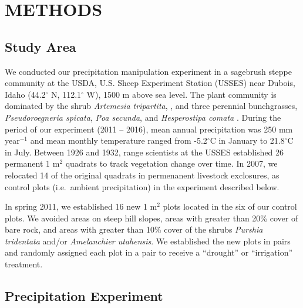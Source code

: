 \documentclass[fleqn,10pt,lineno]{wlpeerj} %
\begin{document}
\hypertarget{methods}{%
\section{METHODS}\label{methods}}

\hypertarget{study-area}{%
\subsection{Study Area}\label{study-area}}

We conducted our precipitation manipulation experiment in a sagebrush
steppe community at the USDA, U.S. Sheep Experiment Station (USSES) near
Dubois, Idaho (44.2\(^{\circ}\) N, 112.1\(^{\circ}\) W), 1500 m above
sea level. The plant community is dominated by the shrub
\emph{Artemesia tripartita},
, and three
perennial bunchgrasses, \emph{Pseudoroegneria spicata},
\emph{Poa secunda}, and \emph{Hesperostipa comata}
. During the period of
our experiment (2011 -- 2016), mean annual precipitation was 250 mm
year\(\phantom{}^{-1}\) and mean monthly temperature ranged from
-5.2\(^{\circ}\)C in January to 21.8\(^{\circ}\)C in July. Between 1926
and 1932, range scientists at the USSES established 26 permanent 1
m\(^2\) quadrats to track vegetation change over time. In 2007, we
relocated 14 of the original quadrats in permenanent livestock
exclosures,  as control plots (i.e.~ambient
precipitation) in the experiment described below.

In spring 2011, we established 16 new 1 m\(^2\) plots located in the
 six of our
control plots. We avoided areas on steep hill slopes, areas with greater
than 20\% cover of bare rock, and areas with greater than 10\% cover of
the shrubs \emph{Purshia tridentata} and/or
\emph{Amelanchier utahensis}. We established the new plots in pairs and
randomly assigned each plot in a pair to receive a ``drought'' or
``irrigation'' treatment.

\hypertarget{precipitation-experiment}{%
\subsection{Precipitation Experiment}\label{precipitation-experiment}}
\end{document}

